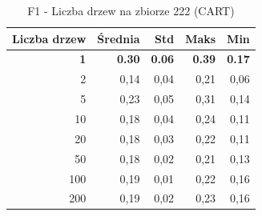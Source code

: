\begin{table}[htbp]
\centering
\small
\setlength{\tabcolsep}{6pt}
\renewcommand{\arraystretch}{1.2}
\caption{F1 - Liczba drzew na zbiorze 222 (CART)}
\label{tab:CART_tree_count_222_f1}
\begin{tabular}{r|r|r|r|r}
\toprule
Liczba drzew & Średnia & Std & Maks & Min \\
\hline
\textbf{1} & \textbf{0.30} & \textbf{0.06} & \textbf{0.39} & \textbf{0.17} \\
2 & 0,14 & 0,04 & 0,21 & 0,06 \\
5 & 0,23 & 0,05 & 0,31 & 0,14 \\
10 & 0,18 & 0,04 & 0,24 & 0,11 \\
20 & 0,18 & 0,03 & 0,22 & 0,11 \\
50 & 0,18 & 0,02 & 0,21 & 0,13 \\
100 & 0,19 & 0,01 & 0,22 & 0,16 \\
200 & 0,19 & 0,02 & 0,23 & 0,16 \\
\bottomrule
\end{tabular}
\end{table}